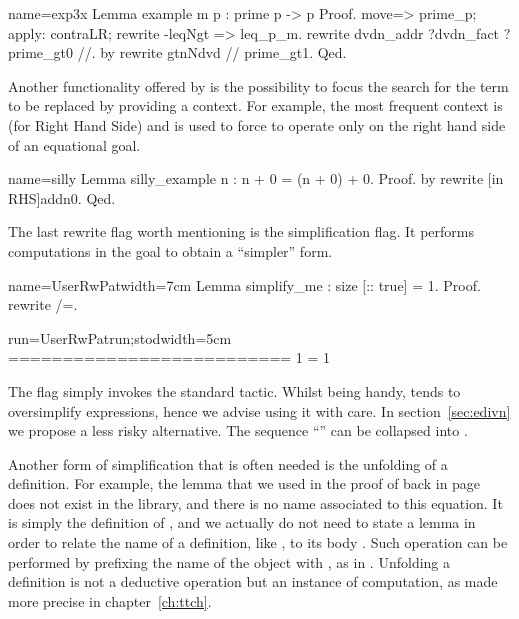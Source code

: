 \begin{coq}{name=exp3x}{}
Lemma example m p : prime p -> p %
Proof.
move=> prime_p; apply: contraLR; rewrite -leqNgt => leq_p_m.
rewrite dvdn_addr ?dvdn_fact ?prime_gt0 //.
by rewrite gtnNdvd // prime_gt1.
Qed.
\end{coq}

Another functionality offered by  is the possibility
to focus the search for the term to be replaced by providing a
context.  For example, the most frequent context is  (for Right
Hand Side) and is used to force  to operate only on the right
hand side of an equational goal.

\begin{coq}{name=silly}{}
Lemma silly_example n : n + 0 = (n + 0) + 0.
Proof. by rewrite [in RHS]addn0. Qed.
\end{coq}


The last rewrite flag worth mentioning is the \C{/=} simplification
flag.  It performs computations in the goal to obtain a ``simpler'' form.

\begin{coq-left}{name=UserRwPat}{width=7cm}
Lemma simplify_me : size [:: true] = 1.
Proof.
rewrite /=.
\end{coq-left}
\begin{coqout-right}{run=UserRwPatrun;stod}{width=5cm}
==========================
1 = 1
\end{coqout-right}

The \C{/=} flag simply invokes the \Coq{} standard 
tactic.  Whilst being handy,  tends to oversimplify
expressions, hence we advise using it with care.
In section~\ref{sec:edivn} we propose a less risky alternative.
The sequence ``\C{// /=}'' can be collapsed into \C{//=}.

Another form of simplification that is often needed is the
unfolding of a definition.
For example, the lemma  that we used in
the proof of  back in page~\pageref{leqE}
does not exist in the library, and there is no name associated to this
equation. It is simply the definition of , and we actually do
not need to state a lemma in order to relate
the name of a definition, like , to its body
. Such operation can be performed by
prefixing the name of the
object with \C{/}, as in . Unfolding a definition is
not a deductive operation but an instance of computation, as
made more precise in chapter~\ref{ch:ttch}.

